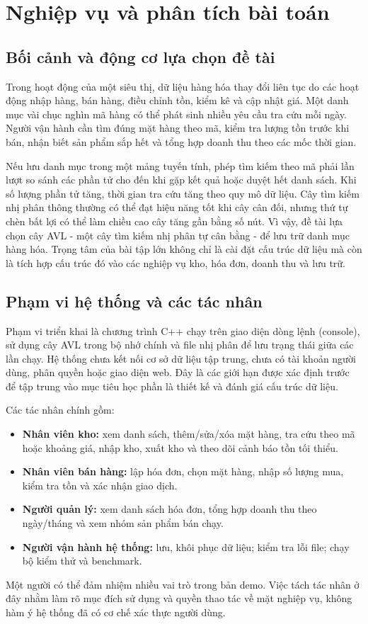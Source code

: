 \chapter{Nghiệp vụ và phân tích bài toán}

\section{Bối cảnh và động cơ lựa chọn đề tài}
Trong hoạt động của một siêu thị, dữ liệu hàng hóa thay đổi liên tục do các hoạt động nhập hàng, bán hàng, điều chỉnh tồn, kiểm kê và cập nhật giá. Một danh mục vài chục nghìn mã hàng có thể phát sinh nhiều yêu cầu tra cứu mỗi ngày. Người vận hành cần tìm đúng mặt hàng theo mã, kiểm tra lượng tồn trước khi bán, nhận biết sản phẩm sắp hết và tổng hợp doanh thu theo các mốc thời gian.

Nếu lưu danh mục trong một mảng tuyến tính, phép tìm kiếm theo mã phải lần lượt so sánh các phần tử cho đến khi gặp kết quả hoặc duyệt hết danh sách. Khi số lượng phần tử tăng, thời gian tra cứu tăng theo quy mô dữ liệu. Cây tìm kiếm nhị phân thông thường có thể đạt hiệu năng tốt khi cây cân đối, nhưng thứ tự chèn bất lợi có thể làm chiều cao cây tăng gần bằng số nút. Vì vậy, đề tài lựa chọn cây AVL - một cây tìm kiếm nhị phân tự cân bằng - để lưu trữ danh mục hàng hóa. Trọng tâm của bài tập lớn không chỉ là cài đặt cấu trúc dữ liệu mà còn là tích hợp cấu trúc đó vào các nghiệp vụ kho, hóa đơn, doanh thu và lưu trữ.

\section{Phạm vi hệ thống và các tác nhân}
Phạm vi triển khai là chương trình C++ chạy trên giao diện dòng lệnh (console), sử dụng cây AVL trong bộ nhớ chính và file nhị phân để lưu trạng thái giữa các lần chạy. Hệ thống chưa kết nối cơ sở dữ liệu tập trung, chưa có tài khoản người dùng, phân quyền hoặc giao diện web. Đây là các giới hạn được xác định trước để tập trung vào mục tiêu học phần là thiết kế và đánh giá cấu trúc dữ liệu.

Các tác nhân chính gồm:
\begin{itemize}
  \item \textbf{Nhân viên kho:} xem danh sách, thêm/sửa/xóa mặt hàng, tra cứu theo mã hoặc khoảng giá, nhập kho, xuất kho và theo dõi cảnh báo tồn tối thiểu.
  \item \textbf{Nhân viên bán hàng:} lập hóa đơn, chọn mặt hàng, nhập số lượng mua, kiểm tra tồn và xác nhận giao dịch.
  \item \textbf{Người quản lý:} xem danh sách hóa đơn, tổng hợp doanh thu theo ngày/tháng và xem nhóm sản phẩm bán chạy.
  \item \textbf{Người vận hành hệ thống:} lưu, khôi phục dữ liệu; kiểm tra lỗi file; chạy bộ kiểm thử và benchmark.
\end{itemize}
Một người có thể đảm nhiệm nhiều vai trò trong bản demo. Việc tách tác nhân ở đây nhằm làm rõ mục đích sử dụng và quyền thao tác về mặt nghiệp vụ, không hàm ý hệ thống đã có cơ chế xác thực người dùng.

